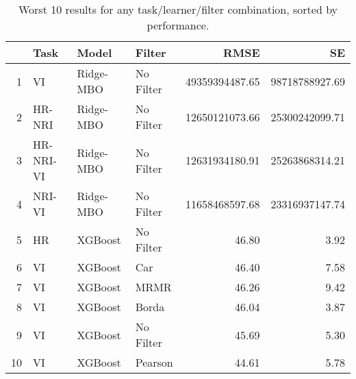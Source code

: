 \begin{table}[ht!]
\centering
\caption{Worst 10 results for any task/learner/filter combination, sorted by performance.} 
\label{tab:perf-worst-10}
\begin{tabular}{rlllrr}
  \hline
 & Task & Model & Filter & RMSE & SE \\ 
  \hline
1 & VI & Ridge-MBO & No Filter & 49359394487.65 & 98718788927.69 \\ 
  2 & HR-NRI & Ridge-MBO & No Filter & 12650121073.66 & 25300242099.71 \\ 
  3 & HR-NRI-VI & Ridge-MBO & No Filter & 12631934180.91 & 25263868314.21 \\ 
  4 & NRI-VI & Ridge-MBO & No Filter & 11658468597.68 & 23316937147.74 \\ 
  5 & HR & XGBoost & No Filter & 46.80 & 3.92 \\ 
  6 & VI & XGBoost & Car & 46.40 & 7.58 \\ 
  7 & VI & XGBoost & MRMR & 46.26 & 9.42 \\ 
  8 & VI & XGBoost & Borda & 46.04 & 3.87 \\ 
  9 & VI & XGBoost & No Filter & 45.69 & 5.30 \\ 
  10 & VI & XGBoost & Pearson & 44.61 & 5.78 \\ 
   \hline
\end{tabular}
\end{table}
